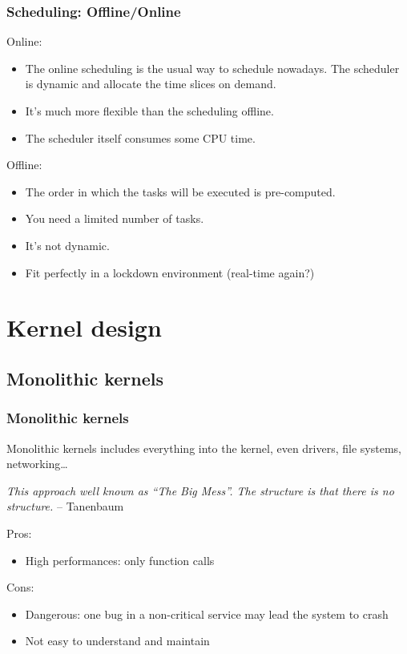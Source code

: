 \begin{frame}
  \frametitle{Scheduling: Offline/Online}
        Online:
        \begin{itemize}
                \item The online scheduling is the usual way to schedule nowadays. The scheduler is dynamic and allocate the time slices on demand.
                \item It's much more flexible than the scheduling offline.
                \item The scheduler itself consumes some CPU time.
        \end{itemize}
        \-
        Offline:
        \begin{itemize}
                \item The order in which the tasks will be executed is pre-computed.
                \item You need a limited number of tasks.
                \item It's not dynamic.
                \item Fit perfectly in a lockdown environment (real-time again?)
        \end{itemize}
\end{frame}

%
%

\section{Kernel design}
\subsection{Monolithic kernels}

%
%

\begin{frame}
  \frametitle{Monolithic kernels}

  Monolithic kernels includes everything into the kernel, even drivers, file systems, networking\ldots

  \-

  \emph{This approach well known as ``The Big Mess''. The structure is that there is no structure.} -- Tanenbaum

  \-

  Pros:

  \begin{itemize}
  \item
    High performances: only function calls
  \end{itemize}

  \-

  Cons:

  \begin{itemize}
  \item
    Dangerous: one bug in a non-critical service may lead the system
    to crash
  \item
    Not easy to understand and maintain
  \end{itemize}

\end{frame}

